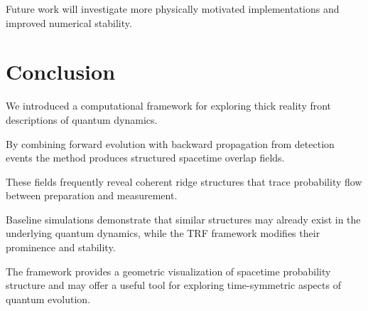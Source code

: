 \documentclass[aps,prl,reprint]{revtex4-2}
\begin{document}
Future work will investigate more physically motivated
implementations and improved numerical stability.



\section{Conclusion}

We introduced a computational framework for exploring thick
reality front descriptions of quantum dynamics.

By combining forward evolution with backward propagation from
detection events the method produces structured spacetime
overlap fields.

These fields frequently reveal coherent ridge structures that
trace probability flow between preparation and measurement.

Baseline simulations demonstrate that similar structures may
already exist in the underlying quantum dynamics, while the
TRF framework modifies their prominence and stability.

The framework provides a geometric visualization of spacetime
probability structure and may offer a useful tool for exploring
time-symmetric aspects of quantum evolution.




\end{document}
